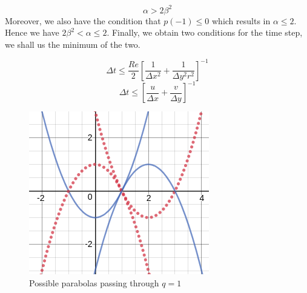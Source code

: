 \documentclass{article}
\begin{document}
\begin{equation}
\alpha > 2 \beta^2
\end{equation}
Moreover, we also have the condition that $p(-1) \leq 0$ which results in $\alpha \leq 2$. Hence we have $2\beta^2<\alpha \leq 2$.
Finally, we obtain two conditions for the time step, we shall us the minimum of the two.

\begin{equation}
\Delta t \leq \frac{Re}{2}\left[\frac{1}{\Delta x^2} + \frac{1}{\Delta y^2r^2}\right]^{-1}
\end{equation}
\begin{equation}
\Delta t \leq  \left[\frac{u}{\Delta x}+\frac{v}{\Delta y}\right]^{-1}
\end{equation}

\begin{figure}[h!]
\centering
\includegraphics[scale=.6]{par1.png}
\caption{Possible parabolas passing through $q=1$}
\label{fig:para1}
\end{figure}
\end{document}
